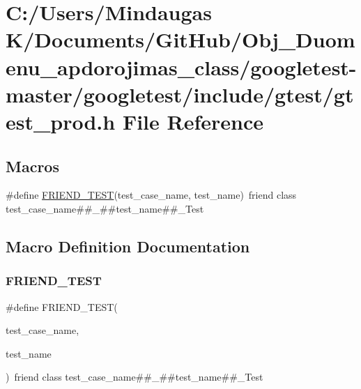 \hypertarget{googletest-master_2googletest_2include_2gtest_2gtest__prod_8h}{}\section{C\+:/\+Users/\+Mindaugas K/\+Documents/\+Git\+Hub/\+Obj\+\_\+\+Duomenu\+\_\+apdorojimas\+\_\+class/googletest-\/master/googletest/include/gtest/gtest\+\_\+prod.h File Reference}
\label{googletest-master_2googletest_2include_2gtest_2gtest__prod_8h}
\subsection*{Macros}
\begin{DoxyCompactItemize}
\item 
\#define \mbox{\hyperlink{googletest-master_2googletest_2include_2gtest_2gtest__prod_8h_a8d443b4cc1d87a7a17943b8fbdbf3910}{F\+R\+I\+E\+N\+D\+\_\+\+T\+E\+ST}}(test\+\_\+case\+\_\+name,  test\+\_\+name)~friend class test\+\_\+case\+\_\+name\#\#\+\_\+\#\#test\+\_\+name\#\#\+\_\+\+Test
\end{DoxyCompactItemize}


\subsection{Macro Definition Documentation}
\mbox{\label{googletest-master_2googletest_2include_2gtest_2gtest__prod_8h_a8d443b4cc1d87a7a17943b8fbdbf3910}} 
\subsubsection{\texorpdfstring{FRIEND\_TEST}{FRIEND\_TEST}}
{\footnotesize\ttfamily \#define F\+R\+I\+E\+N\+D\+\_\+\+T\+E\+ST(\begin{DoxyParamCaption}\item[{}]{test\+\_\+case\+\_\+name,  }\item[{}]{test\+\_\+name }\end{DoxyParamCaption})~friend class test\+\_\+case\+\_\+name\#\#\+\_\+\#\#test\+\_\+name\#\#\+\_\+\+Test}

